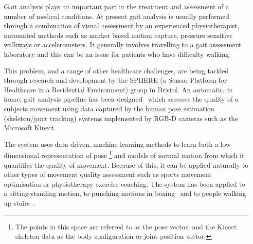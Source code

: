 \documentclass[11pt]{article} %
\begin{document}

Gait analysis plays an important part in the treatment and assessment of a number of medical conditions. At present gait analysis is usually performed through a combination of visual assessment by an experienced physiotherapist, automated methods such as marker based motion capture, pressure sensitive walkways or accelerometers. It generally involves travelling to a gait assessment laboratory and this can be an issue for patients who have difficulty walking. 

This problem, and a range of other healthcare challenges, are being tackled through research and development by the SPHERE (a Sensor Platform for Healthcare in a Residential Environment) group in Bristol. An automatic, in home, gait analysis pipeline has been designed~\cite{Paiement,Tao} which assesses the quality of a subjects movement using data captured by the human pose estimation (skeleton/joint tracking) systems implemented by RGB-D cameras such as the Microsoft Kinect.

The system uses data driven, machine learning methods to learn both a low dimensional representation of pose \footnote{The points in this space are referred to as the pose vector, and the Kinect skeleton data as the body configuration or joint position vector.} and models of normal motion from which it quantifies the quality of movement. Because of this, it can be applied naturally to other types of movement quality assessment such as sports movement optimisation or physiotherapy exercise coaching. The system has been applied to a sitting-standing motion, to punching motions in boxing~\cite{SPHEREweb} and to people walking up stairs~\cite{Paiement,Tao}.
\end{document}

